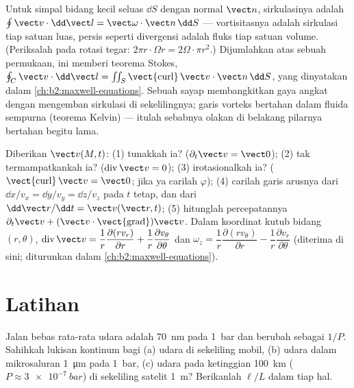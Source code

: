 \begin{remark}\label{rem:b2:fluid-kinematics:stokes}
Untuk simpal bidang kecil seluas $\dd S$ dengan normal $\vect n$,
sirkulasinya adalah $\oint\vect v\cdot\dd\vect l = \vect\omega\cdot\vect n\,\dd S$ ---
vortisitasnya adalah sirkulasi tiap satuan luas, persis seperti
divergensi adalah fluks tiap satuan volume. (Periksalah pada rotasi
tegar: $2\pi r\cdot\Omega r = 2\Omega\cdot\pi r^2$.) Dijumlahkan atas sebuah permukaan,
ini memberi teorema Stokes, $\oint_C\vect v\cdot\dd\vect l = \iint_S
\operatorname{\vect{curl}}\vect v\cdot\vect n\,\dd S$, yang dinyatakan dalam
\cref{ch:b2:maxwell-equations}. Sebuah sayap membangkitkan gaya angkat
dengan mengemban sirkulasi di sekelilingnya; garis vorteks bertahan dalam
fluida sempurna (teorema Kelvin) --- itulah sebabnya olakan di belakang
pilarnya bertahan begitu lama.
\end{remark}

\begin{method}\label{met:b2:fluid-kinematics:reading}
Diberikan $\vect v(M, t)$: (1) tunakkah ia? ($\partial_t\vect v = \vect 0$); (2)
tak termampatkankah ia? ($\operatorname{div}\vect v = 0$); (3)
irotasionalkah ia? ($\operatorname{\vect{curl}}\vect v = \vect 0$; jika ya carilah
$\varphi$); (4) carilah garis arusnya dari $\dd x/v_x = \dd y/v_y = \dd z/
v_z$ pada $t$ tetap, dan  dari $\dd\vect r/\dd t = \vect v(\vect r,
t)$; (5) hitunglah percepatannya $\partial_t\vect v + (\vect v\cdot
\operatorname{\vect{grad}})\vect v$. Dalam koordinat kutub bidang $(r, \theta)$,
$\operatorname{div}\vect v = \dfrac1r\dfrac{\partial(rv_r)}{\partial r} + \dfrac1r
\dfrac{\partial v_\theta}{\partial\theta}$ dan $\omega_z = \dfrac1r\dfrac{\partial(rv_\theta)}
{\partial r} - \dfrac1r\dfrac{\partial v_r}{\partial\theta}$ (diterima di sini; diturunkan
dalam \cref{ch:b2:maxwell-equations}).
\end{method}

\section{Latihan}

\begin{exercise}[$\star$]\label{exo:b2:fluid-kinematics:1}
Jalan bebas rata-rata udara adalah \qty{70}{nm} pada \qty{1}{bar} dan
berubah sebagai $1/P$. Sahihkah lukisan kontinum bagi (a) udara di
sekeliling mobil, (b) udara dalam mikrosaluran \qty{1}{\micro m} pada
\qty{1}{bar}, (c) udara pada ketinggian \qty{100}{km}
($P \approx \qty{3e-7}{bar}$) di sekeliling satelit \qty{1}{m}? Berikanlah
$\ell/L$ dalam tiap hal.
\end{exercise}

